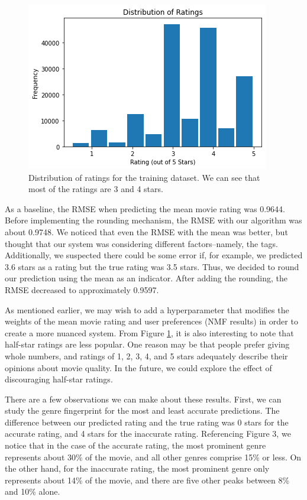 \documentclass[letterpaper, 10 pt, conference]{ieeeconf}  %
\begin{document}
\begin{figure}[h]
    \includegraphics[scale=0.6]{figs/ratingdist.png}
    \caption{Distribution of ratings for the training dataset. We can see that most of the ratings are 3 and 4 stars.}
    \label{ratingdist}
\end{figure}

As a baseline, the RMSE when predicting the mean movie rating was 0.9644. Before implementing the rounding mechanism, the RMSE with our algorithm was about 0.9748. We noticed that even the RMSE with the mean was better, but thought that our system was considering different factors--namely, the tags. Additionally, we suspected there could be some error if, for example, we predicted 3.6 stars as a rating but the true rating was 3.5 stars. Thus, we decided to round our prediction using the mean as an indicator. After adding the rounding, the RMSE decreased to approximately 0.9597. 

As mentioned earlier, we may wish to add a hyperparameter that modifies the weights of the mean movie rating and user preferences (NMF results) in order to create a more nuanced system. From Figure \ref{ratingdist}, it is also interesting to note that half-star ratings are less popular. One reason may be that people prefer giving whole numbers, and ratings of 1, 2, 3, 4, and 5 stars adequately describe their opinions about movie quality. In the future, we could explore the effect of discouraging half-star ratings.

There are a few observations we can make about these results. First, we can study the genre fingerprint for the most and least accurate predictions. The difference between our predicted rating and the true rating was 0 stars for the accurate rating, and 4 stars for the inaccurate rating. Referencing Figure 3, we notice that in the case of the accurate rating, the most prominent genre represents about 30\% of the movie, and all other genres comprise 15\% or less. On the other hand, for the inaccurate rating, the most prominent genre only represents about 14\% of the movie, and there are five other peaks between 8\% and 10\% alone.
\end{document}
